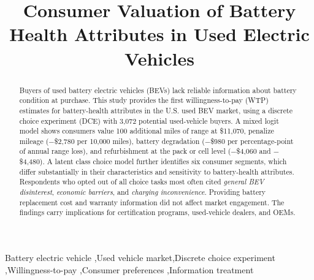 \documentclass[a4paper,fleqn]{cas-sc}   %
\begin{document}
\let\WriteBookmarks\relax
\def\floatpagepagefraction{1}
\def\textpagefraction{.001}
\shorttitle{}


\title [mode = title]{Consumer Valuation of Battery Health Attributes in Used Electric Vehicles}


\begin{abstract}
Buyers of used battery electric vehicles (BEVs) lack reliable information about battery condition at purchase. This study provides the first willingness-to-pay (WTP) estimates for battery-health attributes in the U.S. used BEV market, using a discrete choice experiment (DCE) with 3,072 potential used-vehicle buyers. A mixed logit model shows consumers value 100 additional miles of range at \$11,070, penalize mileage ($-$\$2,780 per 10,000 miles), battery degradation ($-$\$980 per percentage-point of annual range loss), and refurbishment at the pack or cell level ($-$\$4,060 and $-$\$4,480). A latent class choice model further identifies six consumer segments, which differ substantially in their characteristics and sensitivity to battery-health attributes. Respondents who opted out of all choice tasks most often cited \textit{general BEV disinterest}, \textit{economic barriers}, and \textit{charging inconvenience}. Providing battery replacement cost and warranty information did not affect market engagement. The findings carry implications for certification programs, used-vehicle dealers, and OEMs.
\end{abstract}


\begin{keywords}

Battery electric vehicle \sep Used vehicle market\sep Discrete choice experiment \sep Willingness-to-pay \sep Consumer preferences \sep Information treatment
\end{keywords}

\maketitle
\doublespacing
\end{document}
